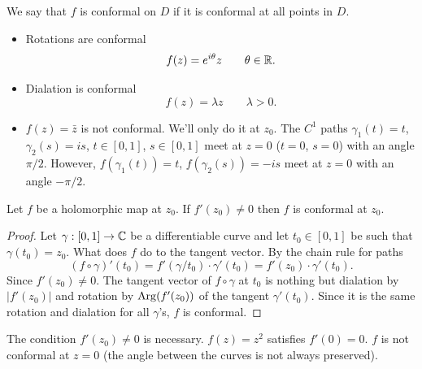 \documentclass[10pt, a4paper]{article}
\begin{document}
We say that $f$ is conformal on $D$ if it is conformal at all points in $D$.

\begin{example}\phantom{}
    \begin{itemize}
        \item Rotations are conformal
        \[
        f(z) = e ^ {i\theta}z\qquad \theta \in \mathbb{R}.
        \]

        \item Dialation is conformal
        \[
        f(z) = \lambda z\qquad \lambda > 0.
        \]

        \item $f(z) = \bar{z}$ is not conformal.
        We'll only do it at $z_0$.
        The $C ^ 1$ paths $\gamma_1(t) = t$,
        $\gamma_2(s) = is$,
        $t \in [0, 1]$,
        $s \in [0, 1]$ meet at $z = 0$
        ($t = 0$,
        $s = 0$)
        with an angle $\pi / 2$.
        However,
        $f(\gamma_1(t)) = t$,
        $f(\gamma_2(s)) = -is$ meet at $z = 0$ with an angle $-\pi / 2$.
    \end{itemize}
\end{example}

\begin{lemma}
    Let $f$ be a holomorphic map at $z_0$.
    If $f'(z_0) \neq 0$ then $f$ is conformal at $z_0$.

    \begin{proof}
        Let $\gamma : [0, 1] \to \mathbb{C}$ be a differentiable curve and let $t_0 \in [0, 1]$ be such that $\gamma(t_0) = z_0$.
        What does $f$ do to the tangent vector.
        By the chain rule for paths
        \[
        (f \circ \gamma)'(t_0) = f'(\gamma / t_0) \cdot \gamma'(t_0) = f'(z_0) \cdot \gamma'(t_0).
        \]
        Since $f'(z_0) \neq 0$.
        The tangent vector of $f \circ \gamma$ at $t_0$ is nothing but dialation by $|f'(z_0)|$ and rotation by $\operatorname{Arg}(f'(z_0))$ of the tangent $\gamma'(t_0)$.
        Since it is the same rotation and dialation for all $\gamma$'s,
        $f$ is conformal.
    \end{proof}
\end{lemma}

\begin{remark}
    The condition $f'(z_0) \neq 0$ is necessary.
    $f(z) = z ^ 2$ satisfies $f'(0) = 0$.
    $f$ is not conformal at $z = 0$
    (the angle between the curves is not always preserved).
\end{remark}
\end{document}
